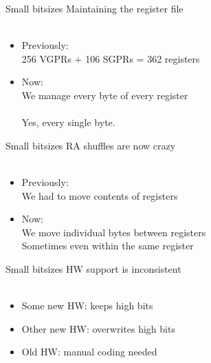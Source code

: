 \documentclass[aspectratio=169,t,xcolor=table]{beamer}
\begin{document}
\begin{frame}{Small bitsizes}
    \LARGE
    Maintaining the register file \\
    \ \\
    \normalsize
    \begin{itemize}
        \item Previously: \\
              256 VGPRs + 106 SGPRs = 362 registers
        \item Now: \\
              We manage every byte of every register \\
              \ \\
              \footnotesize Yes, \large every \LARGE single \Huge byte.
    \end{itemize}
\end{frame}

\begin{frame}{Small bitsizes}
    \LARGE
    RA shuffles are now crazy \\
    \ \\
    \normalsize
    \begin{itemize}
        \item Previously: \\
              We had to move contents of registers
        \item Now: \\
              We move individual bytes between registers \\
              Sometimes even within the same register
    \end{itemize}
\end{frame}

\begin{frame}{Small bitsizes}
    \LARGE
    HW support is inconsistent \\
    \ \\
    \normalsize
    \begin{itemize}
        \item Some new HW: keeps high bits
        \item Other new HW: overwrites high bits
        \item Old HW: manual coding needed
    \end{itemize}
\end{frame}
\end{document}
